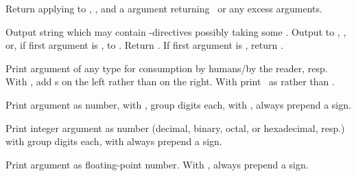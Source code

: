 \begin{LIST}{1cm}

  Return  applying  to
  , , and a  argument
  returning \NIL\ or any excess arguments. 

  Output string  which may
  contain \kwd{\TLD}-directives possibly taking some
  .
  Output to , , or, if first
  argument is \T, to . Return \retval{\NIL}. If
  first argument is \NIL, return . 

  \begin{LIST}{.5cm}

    Print argument of any type for consumption by humans/by the
    reader, resp. With , add s on the left
    rather than on the right. With \kwd{:} print \NIL\ as \LIT{()} rather
    than .

    Print argument as number, with \KWD{:}, group digits 
     each, with , always prepend a sign.

    Print integer argument as number (decimal, binary, octal, or
    hexadecimal, resp.) with \kwd{:} group digits 
     each, with  always prepend a sign.

    Print argument as floating-point number. With , always prepend a sign.


\end{LIST}
\end{LIST}
